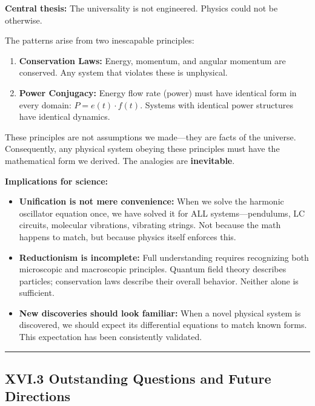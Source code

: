 \documentclass[
]{article}
\begin{document}
\textbf{Central thesis:} The universality is not engineered. Physics
could not be otherwise.

The patterns arise from two inescapable principles:

\begin{enumerate}
\def\labelenumi{\arabic{enumi}.}
\item
  \textbf{Conservation Laws:} Energy, momentum, and angular momentum are
  conserved. Any system that violates these is unphysical.
\item
  \textbf{Power Conjugacy:} Energy flow rate (power) must have identical
  form in every domain: \(P = e(t) \cdot f(t)\). Systems with identical
  power structures have identical dynamics.
\end{enumerate}

These principles are not assumptions we made---they are facts of the
universe. Consequently, any physical system obeying these principles
must have the mathematical form we derived. The analogies are
\textbf{inevitable}.

\textbf{Implications for science:}

\begin{itemize}
\item
  \textbf{Unification is not mere convenience:} When we solve the
  harmonic oscillator equation once, we have solved it for ALL
  systems---pendulums, LC circuits, molecular vibrations, vibrating
  strings. Not because the math happens to match, but because physics
  itself enforces this.
\item
  \textbf{Reductionism is incomplete:} Full understanding requires
  recognizing both microscopic and macroscopic principles. Quantum field
  theory describes particles; conservation laws describe their overall
  behavior. Neither alone is sufficient.
\item
  \textbf{New discoveries should look familiar:} When a novel physical
  system is discovered, we should expect its differential equations to
  match known forms. This expectation has been consistently validated.
\end{itemize}

\begin{center}\rule{0.5\linewidth}{0.5pt}\end{center}

\subsection{XVI.3 Outstanding Questions and Future
Directions}\label{xvi.3-outstanding-questions-and-future-directions}
\end{document}
